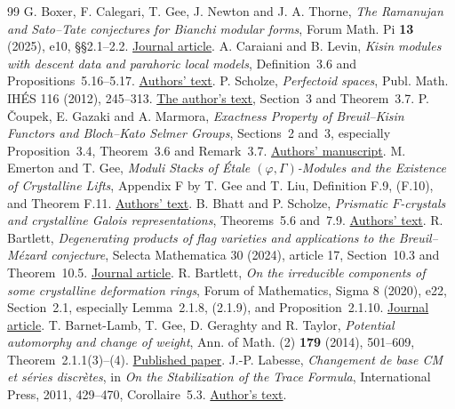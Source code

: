 \documentclass[a4paper,11pt]{article}
\theoremstyle{definition}
\theoremstyle{remark}
\numberwithin{equation}{section}
\begin{document}
\begin{thebibliography}{99}
 G. Boxer, F. Calegari, T. Gee, J. Newton and J. A. Thorne, \emph{The Ramanujan and Sato--Tate conjectures for Bianchi modular forms}, Forum Math. Pi \textbf{13} (2025), e10, \S\S2.1--2.2. \href{https://doi.org/10.1017/fmp.2024.29}{Journal article}.
 A. Caraiani and B. Levin, \emph{Kisin modules with descent data and parahoric local models}, Definition~3.6 and Propositions~5.16--5.17. \href{https://www.ma.imperial.ac.uk/~acaraian/papers/kisinmodules.pdf}{Authors' text}.
 P. Scholze, \emph{Perfectoid spaces}, Publ. Math. IH\'ES 116 (2012), 245--313. \href{https://people.mpim-bonn.mpg.de/scholze/PerfectoidSpaces.pdf}{The author's text}, Section~3 and Theorem~3.7.
 P. \v{C}oupek, E. Gazaki and A. Marmora, \emph{Exactness Property of Breuil--Kisin Functors and Bloch--Kato Selmer Groups}, Sections~2 and~3, especially Proposition~3.4, Theorem~3.6 and Remark~3.7. \href{https://irma.math.unistra.fr/~marmora/2603.26035v1.pdf}{Authors' manuscript}.
 M. Emerton and T. Gee, \emph{Moduli Stacks of \'Etale $(\varphi,\Gamma)$-Modules and the Existence of Crystalline Lifts}, Appendix F by T. Gee and T. Liu, Definition F.9, (F.10), and Theorem F.11. \href{https://www.math.uchicago.edu/~emerton/pdffiles/moduli.pdf}{Authors' text}.
 B. Bhatt and P. Scholze, \emph{Prismatic $F$-crystals and crystalline Galois representations}, Theorems~5.6 and~7.9. \href{https://arxiv.org/pdf/2106.14735}{Authors' text}.
 R. Bartlett, \emph{Degenerating products of flag varieties and applications to the Breuil--M\'ezard conjecture}, Selecta Mathematica 30 (2024), article 17, Section~10.3 and Theorem~10.5. \href{https://doi.org/10.1007/s00029-023-00905-3}{Journal article}.
 R. Bartlett, \emph{On the irreducible components of some crystalline deformation rings}, Forum of Mathematics, Sigma 8 (2020), e22, Section~2.1, especially Lemma~2.1.8, (2.1.9), and Proposition~2.1.10. \href{https://doi.org/10.1017/fms.2020.12}{Journal article}.
 T. Barnet-Lamb, T. Gee, D. Geraghty and R. Taylor, \emph{Potential automorphy and change of weight}, Ann. of Math. (2) \textbf{179} (2014), 501--609, Theorem~2.1.1(3)--(4). \href{https://annals.math.princeton.edu/2014/179-2/p03}{Published paper}.
 J.-P. Labesse, \emph{Changement de base CM et s\'eries discr\`etes}, in \emph{On the Stabilization of the Trace Formula}, International Press, 2011, 429--470, Corollaire~5.3. \href{https://webusers.imj-prg.fr/~michael.harris/CBCM.pdf}{Author's text}.

\end{thebibliography}
\end{document}
